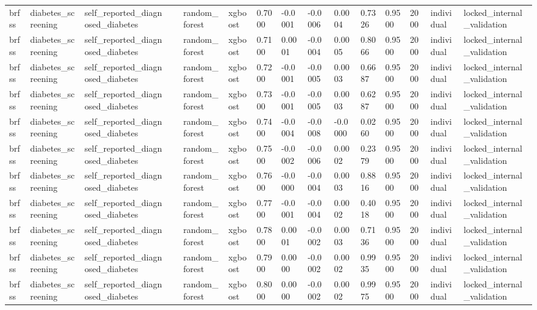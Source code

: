 \begin{tabular}{lllllllllllllll}
brfss & diabetes\_screening & self\_reported\_diagnosed\_diabetes &  & random\_forest & xgboost & 0.7000 & -0.0001 & -0.0006 & 0.0004 & 0.7326 & 0.9500 & 2000 & individual & locked\_internal\_validation \\
brfss & diabetes\_screening & self\_reported\_diagnosed\_diabetes &  & random\_forest & xgboost & 0.7100 & 0.0001 & -0.0004 & 0.0005 & 0.8066 & 0.9500 & 2000 & individual & locked\_internal\_validation \\
brfss & diabetes\_screening & self\_reported\_diagnosed\_diabetes &  & random\_forest & xgboost & 0.7200 & -0.0001 & -0.0005 & 0.0003 & 0.6687 & 0.9500 & 2000 & individual & locked\_internal\_validation \\
brfss & diabetes\_screening & self\_reported\_diagnosed\_diabetes &  & random\_forest & xgboost & 0.7300 & -0.0001 & -0.0005 & 0.0003 & 0.6287 & 0.9500 & 2000 & individual & locked\_internal\_validation \\
brfss & diabetes\_screening & self\_reported\_diagnosed\_diabetes &  & random\_forest & xgboost & 0.7400 & -0.0004 & -0.0008 & -0.0000 & 0.0260 & 0.9500 & 2000 & individual & locked\_internal\_validation \\
brfss & diabetes\_screening & self\_reported\_diagnosed\_diabetes &  & random\_forest & xgboost & 0.7500 & -0.0002 & -0.0006 & 0.0002 & 0.2379 & 0.9500 & 2000 & individual & locked\_internal\_validation \\
brfss & diabetes\_screening & self\_reported\_diagnosed\_diabetes &  & random\_forest & xgboost & 0.7600 & -0.0000 & -0.0004 & 0.0003 & 0.8816 & 0.9500 & 2000 & individual & locked\_internal\_validation \\
brfss & diabetes\_screening & self\_reported\_diagnosed\_diabetes &  & random\_forest & xgboost & 0.7700 & -0.0001 & -0.0004 & 0.0002 & 0.4018 & 0.9500 & 2000 & individual & locked\_internal\_validation \\
brfss & diabetes\_screening & self\_reported\_diagnosed\_diabetes &  & random\_forest & xgboost & 0.7800 & 0.0001 & -0.0002 & 0.0003 & 0.7136 & 0.9500 & 2000 & individual & locked\_internal\_validation \\
brfss & diabetes\_screening & self\_reported\_diagnosed\_diabetes &  & random\_forest & xgboost & 0.7900 & 0.0000 & -0.0002 & 0.0002 & 0.9935 & 0.9500 & 2000 & individual & locked\_internal\_validation \\
brfss & diabetes\_screening & self\_reported\_diagnosed\_diabetes &  & random\_forest & xgboost & 0.8000 & 0.0000 & -0.0002 & 0.0002 & 0.9975 & 0.9500 & 2000 & individual & locked\_internal\_validation \\

\end{tabular}
